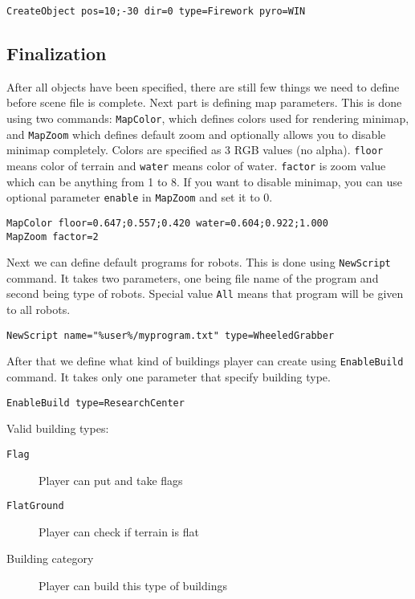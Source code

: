 \begin{lstlisting}[style=scene]
CreateObject pos=10;-30 dir=0 type=Firework pyro=WIN
\end{lstlisting}


\subsection{Finalization}

After all objects have been specified, there are still few things we need to define before scene file is complete. Next part is defining map parameters. This is done using two commands: \texttt{MapColor}, which defines colors used for rendering minimap, and \texttt{MapZoom} which defines default zoom and optionally allows you to disable minimap completely. Colors are specified as 3 RGB values (no alpha). \texttt{floor} means color of terrain and \texttt{water} means color of water. \texttt{factor} is zoom value which can be anything from 1 to 8. If you want to disable minimap, you can use optional parameter \texttt{enable} in \texttt{MapZoom} and set it to 0.

\begin{lstlisting}[style=scene]
MapColor floor=0.647;0.557;0.420 water=0.604;0.922;1.000
MapZoom factor=2
\end{lstlisting}

Next we can define default programs for robots. This is done using \texttt{NewScript} command. It takes two parameters, one being file name of the program and second being type of robots. Special value \texttt{All} means that program will be given to all robots.

\begin{lstlisting}[style=scene]
NewScript name="%user%/myprogram.txt" type=WheeledGrabber
\end{lstlisting}

After that we define what kind of buildings player can create using \texttt{EnableBuild} command. It takes only one parameter that specify building type.

\begin{lstlisting}[style=scene]
EnableBuild type=ResearchCenter
\end{lstlisting}

Valid building types:


\begin{description}
    \item[\texttt{Flag}] Player can put and take flags
    \item[\texttt{FlatGround}] Player can check if terrain is flat
    \item[Building category] Player can build this type of buildings
\end{description}

